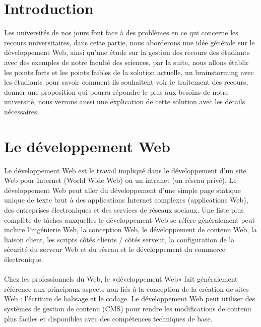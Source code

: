 \documentclass[12pt]{report}
\begin{document}
\section{Introduction}
\vspace{0.2in}
Les universités de nos jours font face à des problèmes en ce qui concerne les recours universitaires, dans cette partie, nous aborderons une idée générale sur le développement Web, ainsi qu'une étude sur la gestion des recours des étudiants avec des exemples de notre faculté des sciences, par la suite, nous allons établir les points forts et les points faibles de la solution actuelle, un brainstorming avec les étudiants pour savoir comment ils souhaitent voir le traitement des recours, donner une proposition  qui pourra répondre le plus aux besoins de notre université, nous verrons aussi une explication de cette solution avec les détails nécessaires.

\vspace{0.7in}


\newpage

\section{Le développement Web}
\vspace{0.2in}
Le développement Web est le travail impliqué dans le développement d'un site Web pour Internet (World Wide Web) ou un intranet (un réseau privé). Le développement Web peut aller du développement d'une simple page statique unique de texte brut à des applications Internet complexes (applications Web), des entreprises électroniques et des services de réseaux sociaux. Une liste plus complète de tâches auxquelles le développement Web se réfère généralement peut inclure l'ingénierie Web, la conception Web, le développement de contenu Web, la liaison client, les scripts côtés clients / côtés serveur, la configuration de la sécurité du serveur Web et du réseau et le développement du commerce électronique.
\\\\
Chez les professionnels du Web, le «développement Web» fait généralement référence aux principaux aspects non liés à la conception de la création de sites Web : l'écriture de balisage et le codage. Le développement Web peut utiliser des systèmes de gestion de contenu (CMS) pour rendre les modifications de contenu plus faciles et disponibles avec des compétences techniques de base.
\end{document}
